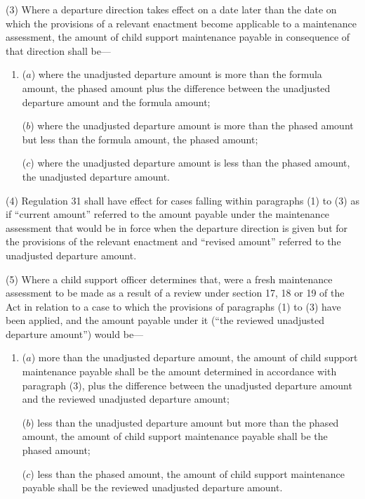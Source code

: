 \documentclass[a4paper]{article}
\begin{document}
(3) Where a departure direction takes effect on a date later than the date on
which the provisions of a relevant enactment become applicable to a maintenance
assessment, the amount of child support maintenance payable in consequence of
that direction shall be—
\begin{enumerate}\item[]
($a$) where the unadjusted departure amount is more than the formula amount, the
phased amount plus the difference between the unadjusted departure amount and
the formula amount;

($b$) where the unadjusted departure amount is more than the phased amount but less
than the formula amount, the phased amount;

($c$) where the unadjusted departure amount is less than the phased amount, the
unadjusted departure amount.
\end{enumerate}

(4) Regulation 31 shall have effect for cases falling within paragraphs (1) to
(3) as if “current amount” referred to the amount payable under the maintenance
assessment that would be in force when the departure direction is given but for
the provisions of the relevant enactment and “revised amount” referred to the
unadjusted departure amount.

(5) Where a child support officer determines that, were a fresh maintenance
assessment to be made as a result of a review under section 17, 18 or 19 of the
Act in relation to a case to which the provisions of paragraphs (1) to (3) have
been applied, and the amount payable under it (“the reviewed unadjusted
departure amount”) would be—
\begin{enumerate}\item[]
($a$) more than the unadjusted departure amount, the amount of child support
maintenance payable shall be the amount determined in accordance with paragraph
(3), plus the difference between the unadjusted departure amount and the
reviewed unadjusted departure amount;

($b$) less than the unadjusted departure amount but more than the phased amount,
the amount of child support maintenance payable shall be the phased amount;

($c$) less than the phased amount, the amount of child support maintenance payable
shall be the reviewed unadjusted departure amount.
\end{enumerate}
\end{document}
